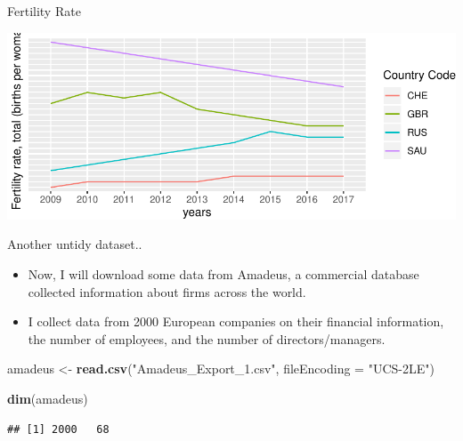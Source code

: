 \documentclass[10pt,ignorenonframetext,]{beamer}
\newenvironment{Shaded}{\begin{snugshade}}{\end{snugshade}}
\newcommand{\DataTypeTok}[1]{\textcolor[rgb]{0.13,0.29,0.53}{#1}}
\newcommand{\KeywordTok}[1]{\textcolor[rgb]{0.13,0.29,0.53}{\textbf{#1}}}
\newcommand{\NormalTok}[1]{#1}
\newcommand{\StringTok}[1]{\textcolor[rgb]{0.31,0.60,0.02}{#1}}
\begin{document}
\begin{frame}{Fertility Rate}
\protect\hypertarget{fertility-rate-1}{}

\includegraphics{PresentationTidyData_files/figure-beamer/unnamed-chunk-17-1.pdf}

\end{frame}

\begin{frame}[fragile]{Another untidy dataset..}
\protect\hypertarget{another-untidy-dataset..}{}

\begin{itemize}
\item
  Now, I will download some data from Amadeus, a commercial database
  collected information about firms across the world.
\item
  I collect data from 2000 European companies on their financial
  information, the number of employees, and the number of
  directors/managers.
\end{itemize}

\begin{Shaded}
\begin{Highlighting}[]
\NormalTok{amadeus <-}\StringTok{ }\KeywordTok{read.csv}\NormalTok{(}\StringTok{"Amadeus_Export_1.csv"}\NormalTok{, }\DataTypeTok{fileEncoding =} \StringTok{"UCS-2LE"}\NormalTok{)}

\KeywordTok{dim}\NormalTok{(amadeus)}
\end{Highlighting}
\end{Shaded}

\begin{verbatim}
## [1] 2000   68
\end{verbatim}

\end{frame}
\end{document}

